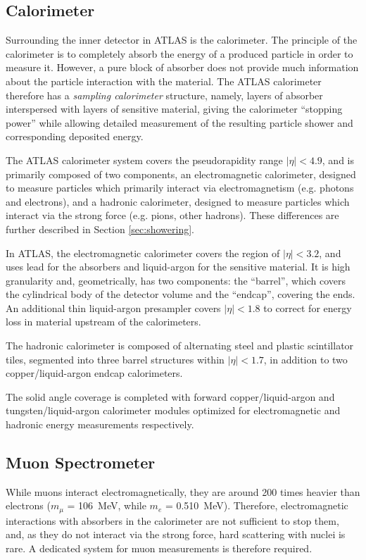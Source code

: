 \subsection{Calorimeter}
Surrounding the inner detector in ATLAS is the calorimeter. The principle of the calorimeter is to 
completely absorb the energy of a produced particle in order to measure it. However, a pure block 
of absorber does not provide much information about the particle interaction with the material. 
The ATLAS calorimeter therefore has a \emph{sampling calorimeter} structure, namely, layers 
of absorber interspersed with layers of sensitive material, giving the calorimeter ``stopping power'' 
while allowing detailed measurement of the resulting particle shower and corresponding deposited energy.

The ATLAS calorimeter system covers the pseudorapidity range \(|\eta| < 4.9\), 
and is primarily composed of two components, an electromagnetic calorimeter, 
designed to measure particles which primarily interact via electromagnetism 
(e.g. photons and electrons), and a hadronic calorimeter, designed to measure 
particles which interact via the strong force (e.g. pions, other hadrons). These differences 
are further described in Section \ref{sec:showering}.

In ATLAS, the electromagnetic calorimeter covers the region of \(|\eta|< 3.2\),
and uses lead for the absorbers and liquid-argon for the sensitive material. It is high 
granularity and, geometrically, has two components: the ``barrel'', which covers the cylindrical body 
of the detector volume and the ``endcap'', covering the ends. An additional thin liquid-argon presampler 
covers \(|\eta| < 1.8\) to correct for energy loss in material upstream of the calorimeters.

The hadronic calorimeter is composed of alternating steel and plastic scintillator tiles,
segmented into three barrel structures within \(|\eta| < 1.7\), in addition to two copper/liquid-argon 
endcap calorimeters.

The solid angle coverage is completed with forward copper/liquid-argon and tungsten/liquid-argon 
calorimeter modules optimized for electromagnetic and hadronic energy measurements respectively.

\subsection{Muon Spectrometer}
While muons interact electromagnetically, they are around 200 times heavier than electrons 
($m_{\mu}$ = \SI{106}{\MeV}, while $m_{e}$ = \SI{0.510}{\MeV}). 
Therefore, electromagnetic interactions with absorbers in the calorimeter 
are not sufficient to stop them, and, as they do not interact via the strong force, hard scattering with 
nuclei is rare. A dedicated system for muon measurements is therefore required. 

